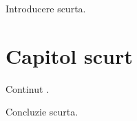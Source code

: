 \documentclass[a4paper,12pt]{report}
\begin{document}
\introChapter
Introducere scurta.

\chapter{Capitol scurt}
Continut \cite{png_spec}.

\finalConclusionChapter
Concluzie scurta.

\bibliographyChapter
\end{document}
